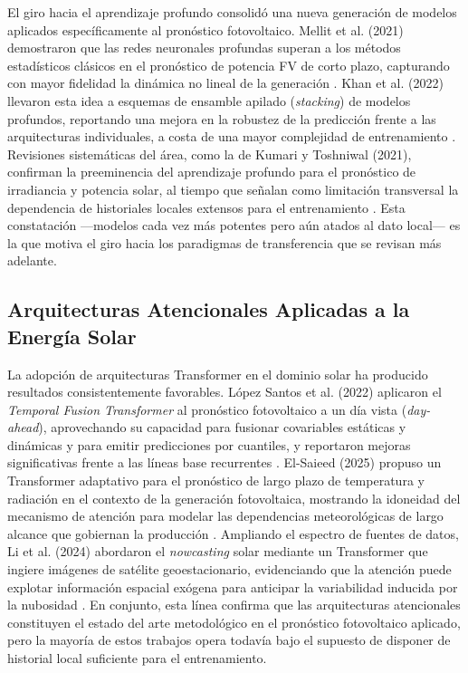 El giro hacia el aprendizaje profundo consolidó una nueva generación de modelos aplicados específicamente al pronóstico fotovoltaico. Mellit et al. (2021) demostraron que las redes neuronales profundas superan a los métodos estadísticos clásicos en el pronóstico de potencia FV de corto plazo, capturando con mayor fidelidad la dinámica no lineal de la generación \cite{Mellit2021}. Khan et al. (2022) llevaron esta idea a esquemas de ensamble apilado (\textit{stacking}) de modelos profundos, reportando una mejora en la robustez de la predicción frente a las arquitecturas individuales, a costa de una mayor complejidad de entrenamiento \cite{Khan2022}. Revisiones sistemáticas del área, como la de Kumari y Toshniwal (2021), confirman la preeminencia del aprendizaje profundo para el pronóstico de irradiancia y potencia solar, al tiempo que señalan como limitación transversal la dependencia de historiales locales extensos para el entrenamiento \cite{Kumari2021}. Esta constatación —modelos cada vez más potentes pero aún atados al dato local— es la que motiva el giro hacia los paradigmas de transferencia que se revisan más adelante.

\subsection{Arquitecturas Atencionales Aplicadas a la Energía Solar}
La adopción de arquitecturas Transformer en el dominio solar ha producido resultados consistentemente favorables. López Santos et al. (2022) aplicaron el \textit{Temporal Fusion Transformer} al pronóstico fotovoltaico a un día vista (\textit{day-ahead}), aprovechando su capacidad para fusionar covariables estáticas y dinámicas y para emitir predicciones por cuantiles, y reportaron mejoras significativas frente a las líneas base recurrentes \cite{LopezSantos2022}. El-Saieed (2025) propuso un Transformer adaptativo para el pronóstico de largo plazo de temperatura y radiación en el contexto de la generación fotovoltaica, mostrando la idoneidad del mecanismo de atención para modelar las dependencias meteorológicas de largo alcance que gobiernan la producción \cite{ElSaieed2025}. Ampliando el espectro de fuentes de datos, Li et al. (2024) abordaron el \textit{nowcasting} solar mediante un Transformer que ingiere imágenes de satélite geoestacionario, evidenciando que la atención puede explotar información espacial exógena para anticipar la variabilidad inducida por la nubosidad \cite{Li2024}. En conjunto, esta línea confirma que las arquitecturas atencionales constituyen el estado del arte metodológico en el pronóstico fotovoltaico aplicado, pero la mayoría de estos trabajos opera todavía bajo el supuesto de disponer de historial local suficiente para el entrenamiento.

